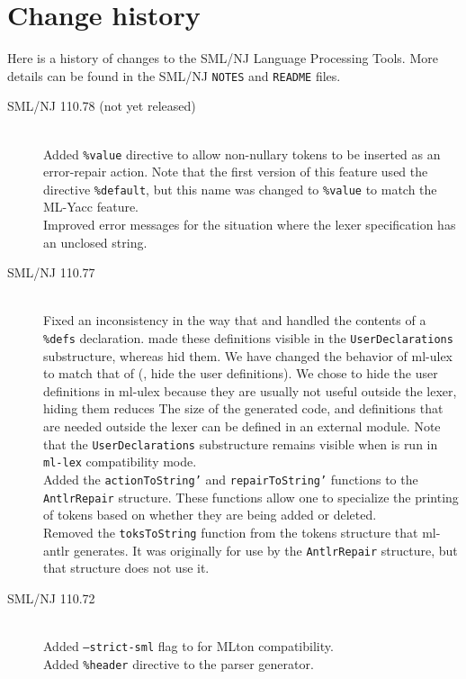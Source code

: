 %
\chapter{Change history}
\label{ch:history}

Here is a history of changes to the SML/NJ Language Processing Tools.
More details can be found in the SML/NJ \texttt{NOTES} and \texttt{README} files.
\begin{description}
  \item[SML/NJ 110.78 (not yet released)]
    \mbox{}\\[0.5em]
    Added \texttt{\%value} directive to allow non-nullary tokens to be inserted as
    an error-repair action.
    Note that the first version of this feature used the directive \texttt{\%default}, but
    this name was changed to \texttt{\%value} to match the ML-Yacc feature.
    \\[0.5em]
    Improved error messages for the situation where the lexer specification has an unclosed string.
  \item[SML/NJ 110.77]
    \mbox{}\\[0.5em]
    Fixed an inconsistency in the way that \mlantlr{} and \ulex{} handled the contents of
    a \texttt{\%defs} declaration.  \ulex{} made these definitions visible in the \texttt{UserDeclarations}
    substructure, whereas \mlantlr{} hid them.  We have changed the behavior of ml-ulex to match
    that of \mlantlr{} (\ie{}, hide the user definitions).  We chose to hide the user definitions
    in ml-ulex because they are usually not useful outside the lexer, hiding them reduces The
    size of the generated code, and definitions that are needed outside the lexer can be
    defined in an external module.  Note that the \texttt{UserDeclarations} substructure remains
    visible when \ulex{} is run in \texttt{ml-lex} compatibility mode.
    \\[0.5em]
    Added the \texttt{actionToString'} and \texttt{repairToString'} functions
    to the \texttt{AntlrRepair} structure.  These functions allow one to
    specialize the printing of tokens based on whether they are being added or deleted.
    \\[0.5em]
    Removed the \texttt{toksToString} function from the tokens structure that ml-antlr
    generates.  It was originally for use by the \texttt{AntlrRepair} structure, but that
    structure does not use it.
  \item[SML/NJ 110.72]
    \mbox{}\\[0.5em]
    Added \texttt{--strict-sml} flag to \ulex{} for MLton compatibility.
    \\[0.5em]
    Added \texttt{\%header} directive to the \mlantlr{} parser generator.
\end{description}%

